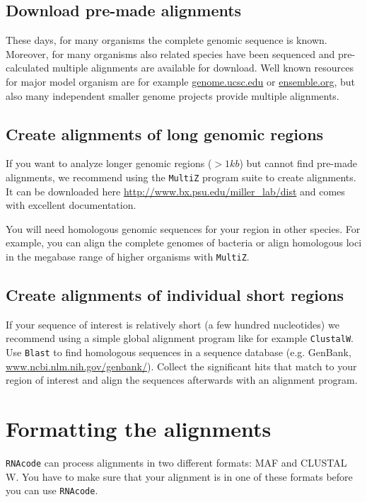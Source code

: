\documentclass{article}
\begin{document}
\subsection{Download pre-made alignments}

These days, for many organisms the complete genomic sequence is
known. Moreover, for many organisms also related species have been
sequenced and pre-calculated multiple alignments are available for
download. Well known resources for major model organism are for
example \url{genome.ucsc.edu} or \url{ensemble.org}, but also many
independent smaller genome projects provide multiple alignments.

\subsection{Create alignments of long genomic regions}

If you want to analyze longer genomic regions ($>1kb$) but cannot find
pre-made alignments, we recommend using the \texttt{MultiZ} program
suite to create alignments. It can be downloaded here
\url{http://www.bx.psu.edu/miller_lab/dist} and comes with excellent
documentation. 

You will need homologous genomic sequences for your region in other
species. For example, you can align the complete genomes of bacteria
or align homologous loci in the megabase range of higher organisms
with \texttt{MultiZ}.

\subsection{Create alignments of individual short regions}

If your sequence of interest is relatively short (a few hundred
nucleotides) we recommend using a simple global alignment program like
for example \texttt{ClustalW}. Use \texttt{Blast} to find homologous
sequences in a sequence database (e.g. GenBank,
\url{www.ncbi.nlm.nih.gov/genbank/}). Collect the significant hits
that match to your region of interest and align the sequences
afterwards with an alignment program.

\section{Formatting the alignments}

\texttt{RNAcode} can process alignments in two different formats: MAF
and CLUSTAL W. You have to make sure that your alignment is in one of
these formats before you can use \texttt{RNAcode}.
\end{document}
